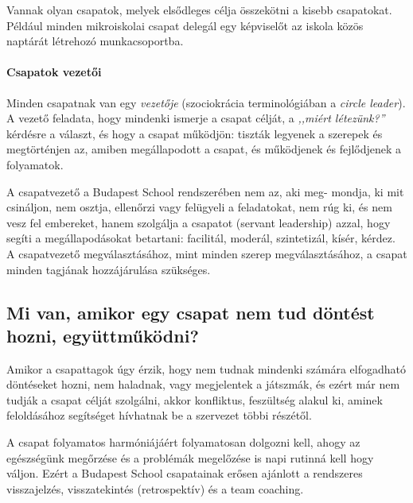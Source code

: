 Vannak olyan csapatok, melyek elsődleges célja összekötni a kisebb csapatokat. Például minden mikroiskolai csapat delegál egy képviselőt az iskola közös naptárát létrehozó munka\-csoportba.

\paragraph{Csapatok vezetői}

Minden csapatnak van egy \emph{vezetője} (szociokrácia terminológiában a
\emph{circle leader}). A vezető feladata, hogy mindenki ismerje a csapat célját, a \emph{,,miért létezünk?''} kérdésre a választ, és hogy a csapat működjön: tiszták legyenek a szerepek és megtörténjen az, amiben megállapodott a csapat, és működjenek és fejlődjenek a folyamatok.

A csapatvezető a Budapest School rendszerében nem az, aki
meg-\linebreak
mondja, ki mit csináljon, nem osztja, ellenőrzi vagy felügyeli a feladatokat, nem rúg ki, és nem vesz fel embereket, hanem szolgálja a csapatot (servant leadership) azzal, hogy segíti a megállapodásokat betartani: facilitál, moderál, szintetizál, kísér, kérdez. A csapatvezető megválasztásához, mint minden szerep megválasztásához, a csapat minden tagjának hozzájárulása szükséges.




\subsection{Mi van, amikor egy csapat nem tud döntést hozni, együttműködni?}

Amikor a csapattagok úgy érzik, hogy nem tudnak mindenki számára elfogadható döntéseket hozni, nem haladnak, vagy megjelentek a játszmák, és ezért már nem tudják a csapat célját szolgálni, akkor konfliktus, feszültség alakul ki, aminek feloldásához segítséget hívhatnak be a szervezet többi részétől. %

A csapat folyamatos harmóniájáért folyamatosan dolgozni kell, ahogy az egészségünk megőrzése és a problémák megelőzése is napi rutinná kell hogy váljon. Ezért a Budapest School csapatainak erősen ajánlott a rendszeres visszajelzés, visszatekintés (retrospektív) és a team coaching.
